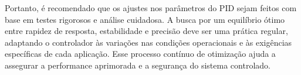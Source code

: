 Portanto, é recomendado que os ajustes nos parâmetros do PID sejam feitos com base em testes rigorosos e análise cuidadosa. A busca por um equilíbrio ótimo entre rapidez de resposta, estabilidade e precisão deve ser uma prática regular, adaptando o controlador às variações nas condições operacionais e às exigências específicas de cada aplicação. Esse processo contínuo de otimização ajuda a assegurar a performance aprimorada e a segurança do sistema controlado.
